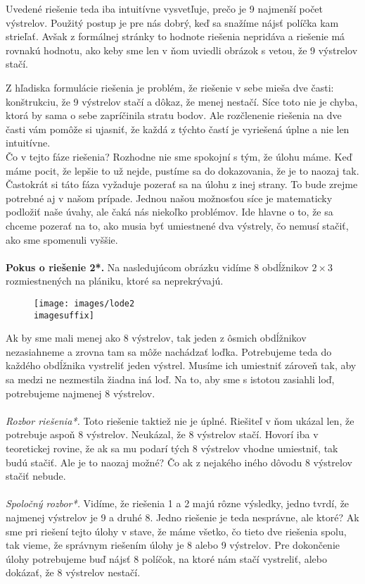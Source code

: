 {{Uvedené riešenie teda iba intuitívne vysvetľuje, prečo je 9 najmenší počet výstrelov. Použitý postup je pre nás dobrý, keď sa snažíme nájsť políčka kam strieľať. Avšak z formálnej stránky to hodnote riešenia nepridáva a riešenie má rovnakú hodnotu, ako keby sme len v ňom uviedli obrázok s vetou, že 9 výstrelov stačí.

Z hľadiska formulácie riešenia je problém, že riešenie v sebe mieša dve časti: konštrukciu, že 9 výstrelov stačí a dôkaz, že menej nestačí. Síce toto nie je chyba, ktorá by sama o sebe zapríčinila stratu bodov. Ale rozčlenenie riešenia na dve časti vám pomôže si ujasniť, že každá z týchto častí je vyriešená úplne a nie len intuitívne.\\

Čo v tejto fáze riešenia? Rozhodne nie sme spokojní s tým, že úlohu máme. Keď máme pocit, že lepšie to už nejde, pustíme sa do dokazovania, že je to naozaj tak. Častokrát si táto fáza vyžaduje pozerať sa na úlohu z inej strany. To bude zrejme potrebné aj v našom prípade. Jednou našou možnosťou síce je matematicky podložiť naše úvahy, ale čaká nás niekoľko problémov. Ide hlavne o to, že sa chceme pozerať na to, ako musia byť umiestnené dva výstrely, čo nemusí stačiť, ako sme spomenuli vyššie.\\
\\
\textbf{Pokus o riešenie 2*.} Na nasledujúcom obrázku vidíme 8 obdĺžnikov $2\times3$ rozmiestnených na plániku, ktoré sa neprekrývajú.

\begin{figure}[h]
    \centering
    \texttt{[image: images/lode2\\imagesuffix]}
    \caption{}
    \label{fig:lode2}
\end{figure}

Ak by sme mali menej ako 8 výstrelov, tak jeden z ôsmich obdĺžnikov nezasiahneme a zrovna tam sa môže nachádzať loďka. Potrebujeme teda do každého obdĺžnika vystreliť jeden výstrel. Musíme ich umiestniť zároveň tak, aby sa medzi ne nezmestila žiadna iná loď. Na to, aby sme s istotou zasiahli loď, potrebujeme najmenej 8 výstrelov.\\
\\
\textit{Rozbor riešenia*.} Toto riešenie taktiež nie je úplné. Riešiteľ v ňom ukázal len, že potrebuje aspoň 8 výstrelov. Neukázal, že 8 výstrelov stačí. Hovorí iba v teoretickej rovine, že ak sa mu podarí tých 8 výstrelov vhodne umiestniť, tak budú stačiť. Ale je to naozaj možné? Čo ak z nejakého iného dôvodu 8 výstrelov stačiť nebude.\\
\\
\textit{Spoločný rozbor*.} Vidíme, že riešenia 1 a 2 majú rôzne výsledky, jedno tvrdí, že najmenej výstrelov je 9 a druhé 8. Jedno riešenie je teda nesprávne, ale ktoré? Ak sme pri riešení tejto úlohy v stave, že máme všetko, čo tieto dve riešenia spolu, tak vieme, že správnym riešením úlohy je 8 alebo 9 výstrelov. Pre dokončenie úlohy potrebujeme buď nájsť 8 políčok, na ktoré nám stačí vystreliť, alebo dokázať, že 8 výstrelov nestačí.

}}
